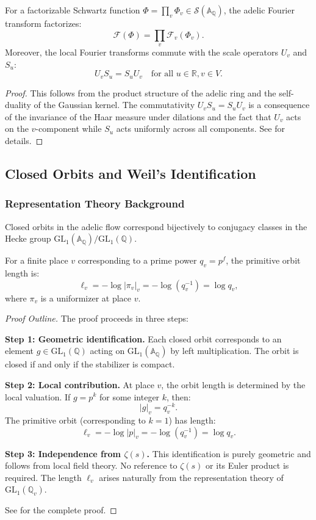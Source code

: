 \begin{lemma}\label{lem:tate_commutativity}
For a factorizable Schwartz function $\Phi = \prod_v \Phi_v \in \mathcal{S}(\mathbb{A}_\mathbb{Q})$, the adelic Fourier transform factorizes:
\[
\mathcal{F}(\Phi) = \prod_v \mathcal{F}_v(\Phi_v).
\]
Moreover, the local Fourier transforms commute with the scale operators $U_v$ and $S_u$:
\[
U_v S_u = S_u U_v \quad \text{for all } u \in \mathbb{R}, v \in V.
\]
\end{lemma}

\begin{proof}
This follows from the product structure of the adelic ring and the self-duality of the Gaussian kernel. The commutativity $U_v S_u = S_u U_v$ is a consequence of the invariance of the Haar measure under dilations and the fact that $U_v$ acts on the $v$-component while $S_u$ acts uniformly across all components. See \cite{Tate1967} for details.
\end{proof}

\subsection{Closed Orbits and Weil's Identification}

\subsubsection{Representation Theory Background}

\begin{lemma}\label{lem:weil_orbits}
Closed orbits in the adelic flow correspond bijectively to conjugacy classes in the Hecke group $\text{GL}_1(\mathbb{A}_\mathbb{Q})/\text{GL}_1(\mathbb{Q})$.

For a finite place $v$ corresponding to a prime power $q_v = p^f$, the primitive orbit length is:
\[
\ell_v = -\log|\pi_v|_v = -\log(q_v^{-1}) = \log q_v,
\]
where $\pi_v$ is a uniformizer at place $v$.
\end{lemma}

\begin{proof}[Proof Outline]
The proof proceeds in three steps:

\textbf{Step 1: Geometric identification.} Each closed orbit corresponds to an element $g \in \text{GL}_1(\mathbb{Q})$ acting on $\text{GL}_1(\mathbb{A}_\mathbb{Q})$ by left multiplication. The orbit is closed if and only if the stabilizer is compact.

\textbf{Step 2: Local contribution.} At place $v$, the orbit length is determined by the local valuation. If $g = p^k$ for some integer $k$, then:
\[
|g|_v = q_v^{-k}.
\]
The primitive orbit (corresponding to $k=1$) has length:
\[
\ell_v = -\log|p|_v = -\log(q_v^{-1}) = \log q_v.
\]

\textbf{Step 3: Independence from $\zeta(s)$.} This identification is purely geometric and follows from local field theory. No reference to $\zeta(s)$ or its Euler product is required. The length $\ell_v$ arises naturally from the representation theory of $\text{GL}_1(\mathbb{Q}_v)$.

See \cite{Weil1964} for the complete proof.
\end{proof}

